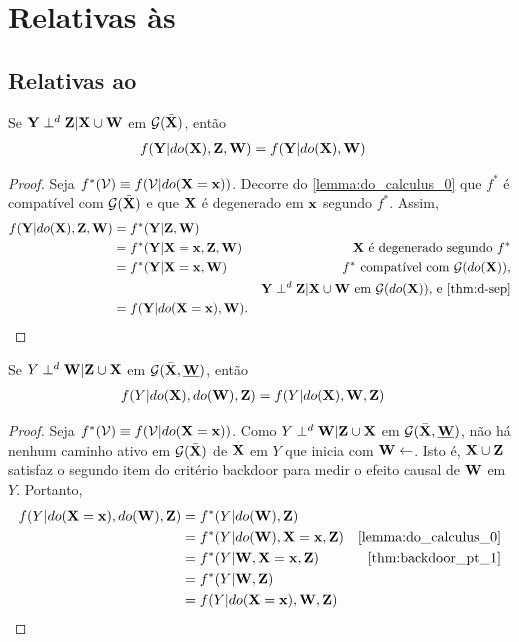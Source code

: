 \section{Relativas às }

\subsection{Relativas ao }

\begin{lemma}
 \label{lemma:do_calculus_1}
 Se ${\mathbf{Y}} \perp^d {\mathbf{Z}} | {\mathbf{X}} \cup {\mathbf{W}}$ em ${\mathcal G}(\bar{{\mathbf{X}}})$, então
 \begin{align*}
  f({\mathbf{Y}}|do({\mathbf{X}}), {\mathbf{Z}}, {\mathbf{W}}) &= f({\mathbf{Y}}|do({\mathbf{X}}), {\mathbf{W}})
 \end{align*}
\end{lemma}

\begin{proof}
 Seja $f^*({\mathcal V}) \equiv f({\mathcal V}|do({\mathbf{X}}={\mathbf{x}}))$. 
 Decorre do \cref{lemma:do_calculus_0} que
 $f^*$ é compatível com ${\mathcal G}(\bar{{\mathbf{X}}})$ e que
 ${\mathbf{X}}$ é degenerado em ${\mathbf{x}}$ segundo $f^*$.
 Assim,
 \begin{align*}
  f(\Y|do(\X), \Z, \W)
  &= f^*(\Y|\Z, \W) \\
  &= f^*(\Y|\X=\x, \Z, \W)
  & \X \text{ é degenerado segundo }  f^* \\
  &= f^*(\Y|\X=\x, \W)
  & f^* \text{ compatível com } \sG(do(\X)) \text{,} \\
  && \Y \dsep \Z | \X \cup \W \text{ em } \sG(do(\X)) \text{, e \cref{thm:d-sep}} \\
  &= f(\Y|do(\X=\x), \W).
 \end{align*}
\end{proof}

\begin{lemma}
 \label{lemma:do_calculus_2}
 Se $Y \perp^d {\mathbf{W}} | {\mathbf{Z}} \cup {\mathbf{X}}$ em
 ${\mathcal G}(\bar{{\mathbf{X}}}, \underline{{\mathbf{W}}})$, então
 \begin{align*}
  f(Y|do({\mathbf{X}}),do({\mathbf{W}}),{\mathbf{Z}}) &= f(Y|do({\mathbf{X}}),{\mathbf{W}},{\mathbf{Z}})
 \end{align*}
\end{lemma}

\begin{proof}
 Seja $f^*({\mathcal V}) \equiv f({\mathcal V}|do({\mathbf{X}}={\mathbf{x}}))$. 
 Como $Y \perp^d {\mathbf{W}} | {\mathbf{Z}} \cup {\mathbf{X}}$ 
 em ${\mathcal G}(\bar{{\mathbf{X}}}, \underline{{\mathbf{W}}})$, 
 não há nenhum caminho ativo em ${\mathcal G}(\bar{{\mathbf{X}}})$
 de ${\mathbf{X}}$ em $Y$ que inicia com ${\mathbf{W}} \leftarrow$.
 Isto é, ${\mathbf{X}} \cup {\mathbf{Z}}$ satisfaz 
 o segundo item do critério backdoor para
 medir o efeito causal de ${\mathbf{W}}$ em $Y$.
 Portanto,
 \begin{align*}
  f(Y|do(\X=\x),do(\W),\Z)
  &= f^*(Y|do(\W),\Z) \\
  &= f^*(Y|do(\W),\X=\x,\Z)
  & \text{\cref{lemma:do_calculus_0}} \\
  &= f^*(Y|\W,\X=\x,\Z)
  & \text{\cref{thm:backdoor_pt_1}} \\
  &= f^*(Y|\W,\Z) \\
  &= f(Y|do(\X=\x),\W,\Z)
 \end{align*}
\end{proof}


